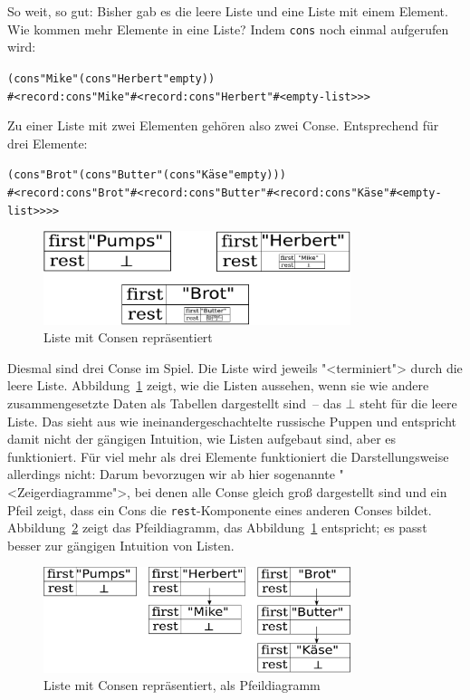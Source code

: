 So weit, so gut: Bisher gab es die leere Liste und eine Liste mit einem
Element.  Wie kommen mehr Elemente in eine Liste?  Indem
\texttt{cons} noch einmal aufgerufen wird:
%
\begin{alltt}
(cons "Mike" (cons "Herbert" empty))
\evalsto{}#<record:cons "Mike" #<record:cons "Herbert" #<empty-list>>>
\end{alltt}
%
Zu einer Liste mit zwei Elementen gehören also zwei Conse.
Entsprechend für drei Elemente:
%
\begin{alltt}
(cons "Brot" (cons "Butter" (cons "Käse" empty)))
\evalsto{}#<record:cons "Brot" #<record:cons "Butter" #<record:cons "Käse" #<empty-list>>>>
\end{alltt}
%
\begin{figure}[tb]
  \centering
  \includegraphics[width=0.8\textwidth]{i1list/pair-lists1}
  \caption{Liste mit Consen repräsentiert}
  \label{fig:cons-lists-1}
\end{figure}
Diesmal sind drei Conse im Spiel.  Die Liste wird jeweils
"<terminiert"> durch die leere Liste.  Abbildung~\ref{fig:cons-lists-1}
zeigt, wie die Listen aussehen, wenn sie wie andere zusammengesetzte
Daten als Tabellen dargestellt sind~-- das $\bot$ steht für die leere
Liste. Das sieht aus wie ineinandergeschachtelte russische Puppen und
entspricht damit nicht der gängigen Intuition, wie Listen aufgebaut
sind, aber es funktioniert.  Für viel mehr als drei Elemente
funktioniert die Darstellungsweise allerdings nicht: Darum bevorzugen
wir ab hier sogenannte "<Zeigerdiagramme">, bei denen alle Conse gleich groß
dargestellt sind und ein Pfeil zeigt, dass ein Cons die
\texttt{rest}-Komponente eines anderen Conses bildet.
Abbildung~\ref{fig:cons-lists-2} zeigt das Pfeildiagramm, das
Abbildung~\ref{fig:cons-lists-1} entspricht; es passt besser zur
gängigen Intuition von Listen.

\begin{figure}[tb]
  \centering
  \includegraphics[width=0.8\textwidth]{i1list/pair-lists2}
  \caption{Liste mit Consen repräsentiert, als Pfeildiagramm}
  \label{fig:cons-lists-2}
\end{figure}


